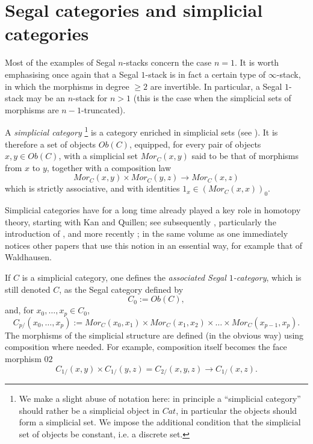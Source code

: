 
\clearpage
\section{Segal categories and simplicial categories}
\label{segsimplpage}

Most of the examples of Segal $n$-stacks concern the case $n=1$. It is worth
emphasising once again that a Segal $1$-stack is in fact a certain type of
$\infty$-stack, in which the morphisms in degree $\geq 2$ are invertible. In
particular, a Segal $1$-stack may be an $n$-stack for $n>1$ (this is the case
when the simplicial sets of morphisms are $n-1$-truncated).


A {\em simplicial category}
\footnote{We make a slight abuse of notation here: in principle a
``simplicial category'' should rather be a simplicial object in $Cat$, in
particular the objects should form a simplicial set. We impose the additional
condition that the simplicial set of objects be constant, i.e. a discrete
set.}
is a category enriched in simplicial sets (see \cite{Kelly}). It is therefore a
set of objects $Ob(C)$, equipped, for every pair of objects $x,y\in Ob(C)$,
with a simplicial set $Mor_C(x,y)$ said to be that of morphisms from $x$ to
$y$, together with a composition law
$$
Mor_C(x,y)\times Mor_C(y,z)\rightarrow Mor_C(x,z)
$$
which is strictly associative, and with identities $1_x\in (Mor_C(x,x))_0$.

Simplicial categories have for a long time already played a key role in
homotopy theory, starting with Kan and Quillen; see subsequently
\cite{DwyerKan1} \cite{DwyerKan2} \cite{DwyerKan3}, particularly the
introduction of \cite{DwyerKanDiags}, and more recently \cite{DHK}; in the
same volume as \cite{DwyerKanDiags} one immediately notices other papers that
use this notion in an essential way, for example that of Waldhausen.

If $C$ is a simplicial category, one defines the {\em associated Segal
$1$-category}, which is still denoted $C$, as the Segal category defined by
$$
C_0:= Ob(C),
$$
and, for $x_0,\ldots , x_p\in C_0$,
$$
C_{p/}(x_0,\ldots ,x_p):= Mor_C(x_0,x_1)\times Mor _C(x_1,x_2)\times \ldots
\times Mor_C(x_{p-1},x_p).
$$
The morphisms of the simplicial structure are defined (in the obvious way)
using composition where needed. For example, composition itself becomes the
face morphism $02$
$$
C_{1/}(x,y)\times C_{1/}(y,z)=C_{2/}(x,y,z)\rightarrow C_{1/}(x,z).
$$

